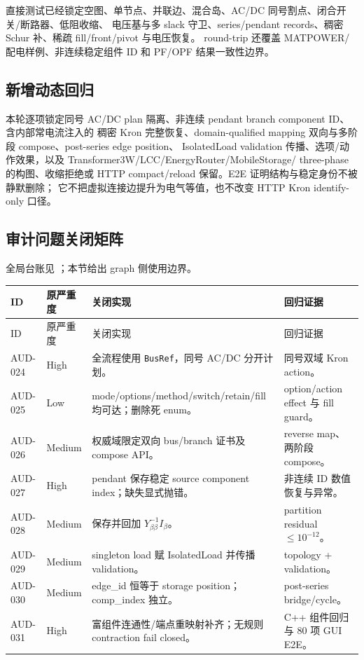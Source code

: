 直接测试已经锁定空图、单节点、并联边、混合岛、AC/DC 同号割点、闭合开关/断路器、低阻收缩、
电压基与多 slack 守卫、series/pendant records、稠密 Schur 补、稀疏 fill/front/pivot 与电压恢复。
round-trip 还覆盖 MATPOWER/配电样例、非连续稳定组件 ID 和 PF/OPF 结果一致性边界。

\subsection{新增动态回归}

本轮逐项锁定同号 AC/DC plan 隔离、非连续 pendant branch component ID、含内部常电流注入的
稠密 Kron 完整恢复、domain-qualified mapping 双向与多阶段 compose、post-series edge position、
IsolatedLoad validation 传播、选项/动作效果，以及 Transformer3W/LCC/EnergyRouter/MobileStorage/
three-phase 的构图、收缩拒绝或 HTTP compact/reload 保留。E2E 证明结构与稳定身份不被静默删除；
它不把虚拟连接边提升为电气等值，也不改变 HTTP Kron identify-only 口径。

\subsection{审计问题关闭矩阵}

全局台账见 ；本节给出 graph 侧使用边界。

\begin{longtable}{@{}L{1.8cm}L{2.0cm}L{7.0cm}L{4.0cm}@{}}
\toprule
ID & 原严重度 & 关闭实现 & 回归证据\\
\midrule
\endfirsthead
\toprule
ID & 原严重度 & 关闭实现 & 回归证据\\
\midrule
\endhead
AUD-024 & High & 全流程使用 \texttt{BusRef}，同号 AC/DC 分开计划。 & 同号双域 Kron action。\\
AUD-025 & Low & mode/options/method/switch/retain/fill 均可达；删除死 enum。 & option/action effect 与 fill guard。\\
AUD-026 & Medium & 权威域限定双向 bus/branch 证书及 compose API。 & reverse map、两阶段 compose。\\
AUD-027 & High & pendant 保存稳定 source component index；缺失显式抛错。 & 非连续 ID 数值恢复与异常。\\
AUD-028 & Medium & 保存并回加 $Y_{\beta\beta}^{-1}I_\beta$。 & partition residual $\le10^{-12}$。\\
AUD-029 & Medium & singleton load 赋 IsolatedLoad 并传播 validation。 & topology + validation。\\
AUD-030 & Medium & edge\_id 恒等于 storage position；comp\_index 独立。 & post-series bridge/cycle。\\
AUD-031 & High & 富组件连通性/端点重映射补齐；无规则 contraction fail closed。 & C++ 组件回归与 80 项 GUI E2E。\\
\bottomrule
\end{longtable}


